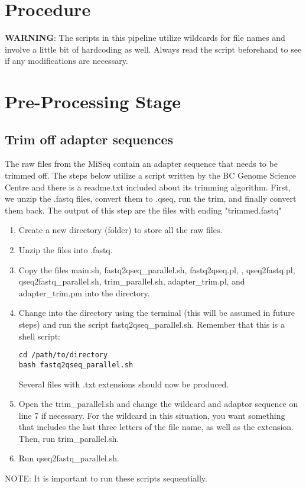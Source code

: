 \documentclass[12pt,titlepage]{article}
\begin{document}
\section*{Procedure}
\textbf{WARNING}: The scripts in this pipeline utilize wildcards for file names and involve a little bit of hardcoding as well. Always read the script beforehand to see if any modifications are necessary.  

\section{Pre-Processing Stage}

\subsection{Trim off adapter sequences}
The raw files from the MiSeq contain an adapter sequence that needs to be trimmed off. The steps below utilize a script written by the BC Genome Science Centre and there is a readme.txt included about its trimming algorithm. First, we unzip the .fastq files, convert them to .qseq, run the trim, and finally convert them back. The output of this step are the files with ending "trimmed.fastq"
\begin{enumerate}
\item Create a new directory (folder) to store all the raw files.
\item Unzip the files into .fastq.
\item Copy the files main.sh, fastq2qseq\_parallel.sh, fastq2qseq.pl, , qseq2fastq.pl, qseq2fastq\_parallel.sh, trim\_parallel.sh, adapter\_trim.pl, and adapter\_trim.pm  into the directory.
\item Change into the directory using the terminal (this will be assumed in future steps) and run the script fastq2qseq\_parallel.sh. Remember that this is a shell script:
\begin{tcolorbox}
\begin{lstlisting}
cd /path/to/directory
bash fastq2qseq_parallel.sh 
\end{lstlisting}
\end{tcolorbox}
Several files with .txt extensions should now be produced.
\item Open the trim\_parallel.sh and change the wildcard and adaptor sequence on line 7 if necessary. For the wildcard in this situation, you want something that includes the last three letters of the file name, as well as the extension. Then, run trim\_parallel.sh.
\item Run qseq2fastq\_parallel.sh.
\end{enumerate}
\noindent NOTE: It is important to run these scripts sequentially.
\end{document}
